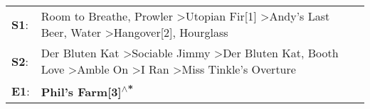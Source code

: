 \begin{supertabular}{p{0.03\textwidth}p{0.92\textwidth}}
 \textbf{S1}:  &                                    Room to Breathe\textsuperscript{}, \enspace Prowler\textsuperscript{} \textgreater \enspace Utopian Fir[1]\textsuperscript{} \textgreater \enspace Andy's Last Beer\textsuperscript{}, \enspace Water\textsuperscript{} \textgreater \enspace Hangover[2]\textsuperscript{}, \enspace Hourglass\textsuperscript{}  \enspace  \\
 \textbf{S2}:  &  Der Bluten Kat\textsuperscript{} \textgreater \enspace Sociable Jimmy\textsuperscript{} \textgreater \enspace Der Bluten Kat\textsuperscript{}, \enspace Booth Love\textsuperscript{} \textgreater \enspace Amble On\textsuperscript{} \textgreater \enspace I Ran\textsuperscript{} \textgreater \enspace Miss Tinkle's Overture\textsuperscript{}  \enspace  \\
 \textbf{E1}:  &                                                                                                                                                                                                                                                                                                   \textbf{Phil's Farm[3]\textsuperscript{$\wedge$*}}  \enspace  \\
\end{supertabular}
